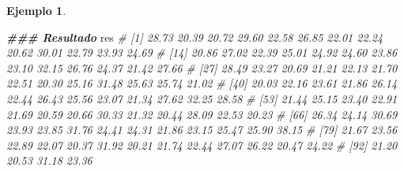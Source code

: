 \documentclass[
]{article}
\newenvironment{Shaded}{\begin{snugshade}}{\end{snugshade}}
\newcommand{\CommentTok}[1]{\textcolor[rgb]{0.56,0.35,0.01}{\textit{#1}}}
\newcommand{\DocumentationTok}[1]{\textcolor[rgb]{0.56,0.35,0.01}{\textbf{\textit{#1}}}}
\newcommand{\NormalTok}[1]{#1}
\theoremstyle{definition}
\theoremstyle{definition}
\newtheorem{example}{Ejemplo}[section]
\theoremstyle{definition}
\theoremstyle{definition}
\theoremstyle{remark}
\begin{document}
\begin{example}
\begin{Shaded}
\begin{Highlighting}[]
\DocumentationTok{\#\#\# Resultado}
\NormalTok{res}
\CommentTok{\#  [1] 28.73 20.39 20.72 29.60 22.58 26.85 22.01 22.24 20.62 30.01 22.79 23.93 24.69}
\CommentTok{\# [14] 20.86 27.02 22.39 25.01 24.92 24.60 23.86 23.10 32.15 26.76 24.37 21.42 27.66}
\CommentTok{\# [27] 28.49 23.27 20.69 21.21 22.13 21.70 22.51 20.30 25.16 31.48 25.63 25.74 21.02}
\CommentTok{\# [40] 20.03 22.16 23.61 21.86 26.14 22.44 26.43 25.56 23.07 21.34 27.62 32.25 28.58}
\CommentTok{\# [53] 21.44 25.15 23.40 22.91 21.69 20.59 20.66 30.33 21.32 20.44 28.09 22.53 20.23}
\CommentTok{\# [66] 26.34 24.14 30.69 23.93 23.85 31.76 24.41 24.31 21.86 23.15 25.47 25.90 38.15}
\CommentTok{\# [79] 21.67 23.56 22.89 22.07 20.37 31.92 20.21 21.74 22.44 27.07 26.22 20.47 24.22}
\CommentTok{\# [92] 21.20 20.53 31.18 23.36}
\end{Highlighting}
\end{Shaded}

\end{example}
\end{document}
